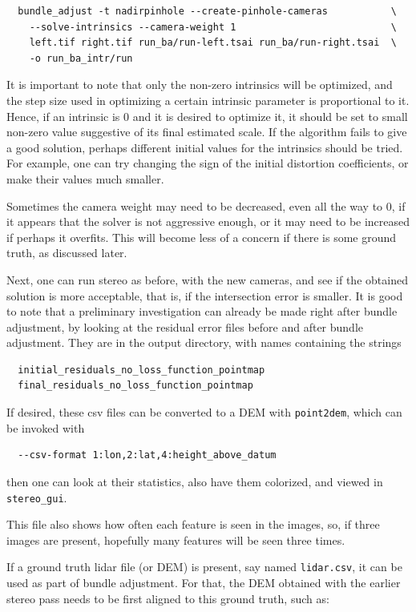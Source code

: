 \begin{verbatim}
  bundle_adjust -t nadirpinhole --create-pinhole-cameras           \
    --solve-intrinsics --camera-weight 1                           \
    left.tif right.tif run_ba/run-left.tsai run_ba/run-right.tsai  \
    -o run_ba_intr/run
\end{verbatim}

It is important to note that only the non-zero intrinsics will be optimized, and the step size
used in optimizing a certain intrinsic parameter is proportional to it. Hence,
if an intrinsic is 0 and it is desired to optimize it, it should be set
to small non-zero value suggestive of its final estimated scale. If
the algorithm fails to give a good solution, perhaps different initial values
for the intrinsics should be tried. For example, one can try changing the sign
of the initial distortion coefficients, or make their values much smaller.

Sometimes the camera weight may need to be decreased, even all the way
to 0, if it appears that the solver is not aggressive enough, or it may
need to be increased if perhaps it overfits. This will become less of a
concern if there is some ground truth, as discussed later.

Next, one can run stereo as before, with the new cameras, and
see if the obtained solution is more acceptable, that is, if the
intersection error is smaller. It is good to note that a preliminary
investigation can already be made right after bundle adjustment, by
looking at the residual error files before and after bundle
adjustment. They are in the output directory, with names containing the
strings
\begin{verbatim}
  initial_residuals_no_loss_function_pointmap
  final_residuals_no_loss_function_pointmap
\end{verbatim}

If desired, these csv files can be converted to a DEM with
\texttt{point2dem}, which can be invoked with
\begin{verbatim}
  --csv-format 1:lon,2:lat,4:height_above_datum
\end{verbatim}

then one can look at their statistics, also have them colorized,
and viewed in \texttt{stereo\_gui}.

This file also shows how often each feature is seen in the images, so, if three
images are present, hopefully many features will be seen three times. 

If a ground truth lidar file (or DEM) is present, say named \texttt{lidar.csv}, it can be used
as part of bundle adjustment. For that, the DEM obtained with the earlier
stereo pass needs to be first aligned to this ground truth, such as:

